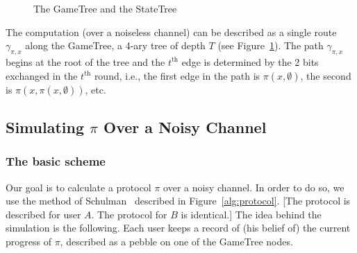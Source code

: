 \documentclass[ letterpaper, 11pt]{article}
\newcommand{\gametree}{\textsf{GameTree}\xspace}
\newcommand{\statetree}{{\textsf{StateTree}}\xspace}
\begin{document}
\begin{figure}[htb]
\begin{framed}
\end{framed}
\caption{The \gametree and the \statetree}
\label{fig:trees}
\end{figure}
The computation (over a noiseless channel) can be described as a single route $\gamma_{\pi,x}$
along the \gametree,
a 4-ary tree of depth $T$ (see Figure~\ref{fig:trees}). The path $\gamma_{\pi,x}$ begins
at the root of the tree
and the $t^{\text{th}}$ edge is determined by the 2 bits exchanged in the $t^{\text{th}}$ round,
i.e., the first edge in the path is $\pi(x,\emptyset)$, the second
is $\pi(x, \pi(x,\emptyset))$, etc.






\subsection{Simulating $\pi$ Over a Noisy Channel}



\subsubsection{The basic scheme}\label{sec:basicScheme}
Our goal is to calculate a protocol $\pi$ over a noisy channel. In order to do so, we use the method
of Schulman~\cite{schulman96} described in Figure~\ref{alg:protocol}.
[The protocol is described for user $A$. The protocol for $B$ is identical.]
The idea behind the simulation is the following.
Each user keeps a record of  (his belief of) the  current progress of $\pi$,
described as a pebble on one of the \gametree nodes.
\end{document}
